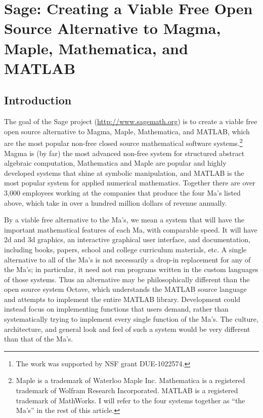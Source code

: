 \documentclass[multi]{cambridge7A}
\theoremstyle{plain}%
\theoremstyle{definition}
\begin{document}
\author[W. Stein]{William Stein\footnote{The work was supported by NSF grant DUE-1022574.}}

\chapter[Sage: Creating a Viable Alternative]{Sage: Creating a Viable Free
  Open Source Alternative to Magma, Maple, Mathematica, and MATLAB}


\maketitle



\section{Introduction}

The goal of the Sage project (\url{http://www.sagemath.org}) is to
create a viable free open source alternative to Magma,
Maple\texttrademark, Mathematica{\textregistered}, and
MATLAB{\textregistered}, which are the most popular non-free closed
source mathematical software systems.\footnote{Maple is a trademark of
  Waterloo Maple Inc.  Mathematica is a registered trademark of
  Wolfram Research Incorporated. MATLAB is a registered trademark of
  MathWorks.  I will refer to the four systems together as ``the Ma's'' in
  the rest of this article.}  Magma is (by far) the most advanced
non-free system for structured abstract algebraic computation,
Mathematica and Maple are popular and highly developed systems that
shine at symbolic manipulation, and MATLAB is the most popular system
for applied numerical mathematics.  Together there are over 3,000
employees working at the companies that produce the four Ma's listed
above, which take in over a hundred million dollars of revenue
annually.

By a viable free alternative to the Ma's, we mean a system that will
have the important mathematical features of each Ma, with comparable
speed.  It will have 2d and 3d graphics, an interactive graphical user
interface, and documentation, including books, papers, school and
college curriculum materials, etc.  A single alternative to all of the
Ma's is not necessarily a drop-in replacement for any of the Ma's; in
particular, it need not run programs written in the custom languages
of those systems.  Thus an alternative may be philosophically
different than the open source system Octave, which understands the
MATLAB source language and attempts to implement the entire MATLAB
library.  Development could instead focus on implementing functions
that users demand, rather than systematically trying to implement
every single function of the Ma's.  The culture, architecture, and
general look and feel of such a system would be very different than
that of the Ma's.
\end{document}
